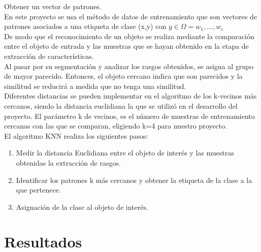 \documentclass[a4paper, 11pt]{article}
\begin{document}
Obtener un vector de patrones.\\

En este proyecto se usa el método de datos de entrenamiento que son vectores de patrones asociados a una etiqueta de clase (x,y) con $y \in \Omega = {w_{1},...,w_{c}}$\\

De modo que el reconocimiento de un objeto se realiza mediante la comparación entre el objeto de entrada y las muestras que se hayan obtenido en la etapa de extracción de características.\\

Al pasar por su segmentación y analizar los rasgos obtenidos, se asigna al grupo de mayor parecido. Entonces, el objeto cercano indica que son parecidos y la similitud se reducirá a medida que no tenga una similitud.\\

Diferentes distancias se pueden implementar en el algoritmo de los k-vecinos más cercanos, siendo la distancia euclidiana la que se utilizó en el desarrollo del proyecto. El parámetro k de vecinos, es el número de muestras de entrenamiento cercanas con las que se comparan, eligiendo k=4 para nuestro proyecto.\\

El algoritmo KNN realiza los siguientes pasos:

\begin{enumerate}
\item Medir la distancia Euclidiana entre el objeto de interés y las muestras obtenidas la extracción de rasgos.
\item Identificar los patrones k más cercanos y obtener la etiqueta de la clase a la que pertenece.
\item Asignación de la clase al objeto de interés.
\end{enumerate}

\newpage
\section{Resultados}
\end{document}
